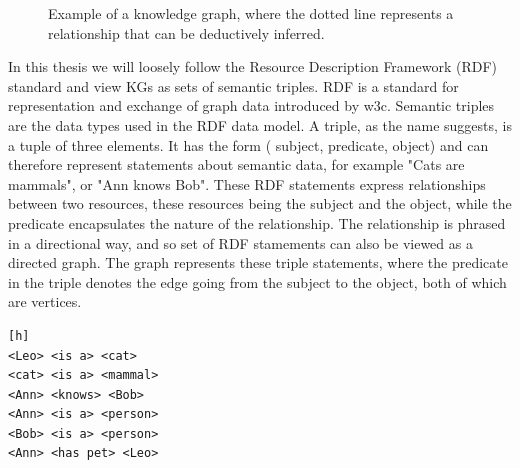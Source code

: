 \begin{figure}[h]
\centering
{}

\caption{Example of a knowledge graph, where the dotted line represents a relationship that can be deductively inferred.} \label{fig:KGexample}
\end{figure}

In this thesis we will loosely follow the Resource Description Framework (RDF) standard and view KGs as sets of semantic triples. RDF is a standard for representation and exchange of graph data introduced by \gls{w3c}. Semantic triples are the data types used in the RDF data model. A triple, as the name suggests, is a tuple of three elements. It has the form ( subject, predicate, object) and can therefore represent statements about semantic data, for example "Cats are mammals", or "Ann knows Bob". These RDF statements express relationships between two resources, these resources being the subject and the object, while the predicate encapsulates the nature of the relationship. The relationship is phrased in a directional way, and so set of RDF stamements can also be viewed as a directed graph. The graph represents these triple statements, where the predicate in the triple denotes the edge going from the subject to the object, both of which are vertices.

\begin{lstlisting}[caption={Example of RDF triple set written in informal pseudocode},label={RDF_triples_example}][h]
<Leo> <is a> <cat>
<cat> <is a> <mammal>
<Ann> <knows> <Bob>
<Ann> <is a> <person>
<Bob> <is a> <person>
<Ann> <has pet> <Leo>
\end{lstlisting}

